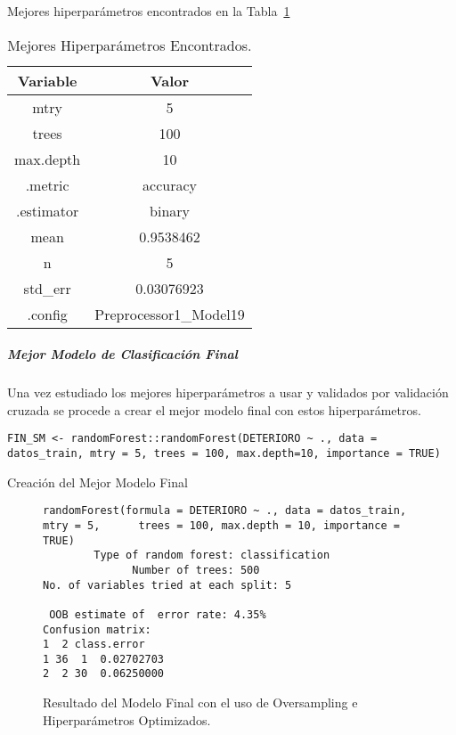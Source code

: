 Mejores hiperparámetros encontrados en la Tabla~\ref{tabla:mejores_hiperparametros}

\begin{table}[H]
    \centering
    \begin{tabular}{|c|c|}
        \hline
        \textbf{Variable} & \textbf{Valor} \\
        \hline
        mtry & 5 \\
        trees & 100 \\
        max.depth & 10 \\
        .metric & accuracy \\
        .estimator & binary \\
        mean & 0.9538462 \\
        n & 5 \\
        std\_err & 0.03076923 \\
        .config & Preprocessor1\_Model19 \\
        \hline
    \end{tabular}
    \caption{Mejores Hiperparámetros Encontrados.}
    \label{tabla:mejores_hiperparametros}
\end{table}

\subparagraph{Mejor Modelo de Clasificación Final}

Una vez estudiado los mejores hiperparámetros a usar y validados por validación cruzada se procede a crear el mejor modelo final con estos hiperparámetros.

\begin{code}[H]
\begin{lstlisting}[style=mystyle]
    FIN_SM <- randomForest::randomForest(DETERIORO ~ ., data = datos_train, mtry = 5, trees = 100, max.depth=10, importance = TRUE)
\end{lstlisting}
\caption{Creación del Mejor Modelo Final}
\label{code:Creación del Mejor Modelo Final}
\end{code}

\begin{figure}[H]
    \centering
    \begin{lstlisting}[frame=single, basicstyle=\small\ttfamily]
randomForest(formula = DETERIORO ~ ., data = datos_train, mtry = 5,      trees = 100, max.depth = 10, importance = TRUE) 
        Type of random forest: classification
              Number of trees: 500
No. of variables tried at each split: 5

 OOB estimate of  error rate: 4.35%
Confusion matrix:
1  2 class.error
1 36  1  0.02702703
2  2 30  0.06250000
    \end{lstlisting}
    \caption{Resultado del Modelo Final con el uso de Oversampling e Hiperparámetros Optimizados.}
    \label{fig:random_forest_FINAL_SMOTE_HIPER}
\end{figure}

